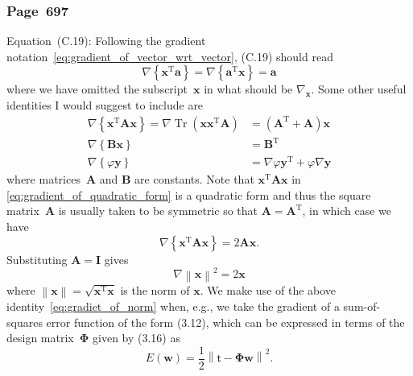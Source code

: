 \documentclass[12pt,a4paper]{article}
\newcommand{\erratum}[1]{%
\subsubsection*{#1}
\addcontentsline{toc}{subsection}{#1}}
\begin{document}
\erratum{Page~697}
Equation~(C.19):
Following the gradient notation~\eqref{eq:gradient_of_vector_wrt_vector}, (C.19) should read
\begin{equation}
\nabla \left\{ \mathbf{x}^{\operatorname{T}} \mathbf{a} \right\} = 
\nabla \left\{ \mathbf{a}^{\operatorname{T}} \mathbf{x} \right\} = 
\mathbf{a}
\end{equation}
where we have omitted the subscript~$\mathbf{x}$ in what should be $\nabla_{\mathbf{x}}$.
Some other useful identities I would suggest to include are
\begin{align}
\nabla \left\{ \mathbf{x}^{\operatorname{T}} \mathbf{A} \mathbf{x} \right\} =
\nabla \operatorname{Tr}\left(\mathbf{x}\mathbf{x}^{\operatorname{T}}\mathbf{A}\right) &=
\left( \mathbf{A}^{\operatorname{T}} + \mathbf{A} \right)\mathbf{x}
\label{eq:gradient_of_quadratic_form} \\
\nabla \left\{ \mathbf{B}\mathbf{x} \right\} & = \mathbf{B}^{\operatorname{T}}
\label{eq:gradient_of_matrix_vector_product} \\
\nabla \left\{ \varphi\mathbf{y} \right\} &=
\nabla\varphi \mathbf{y}^{\operatorname{T}} + \varphi \nabla\mathbf{y}
\label{eq:gradient_of_scalar_vector_product}
\end{align}
where matrices~$\mathbf{A}$ and $\mathbf{B}$ are constants.
Note that $\mathbf{x}^{\operatorname{T}} \mathbf{A} \mathbf{x}$ in
\eqref{eq:gradient_of_quadratic_form} is a quadratic form and thus
the square matrix~$\mathbf{A}$ is usually taken to be symmetric so that
$\mathbf{A} = \mathbf{A}^{\operatorname{T}}$, in which case we have
\begin{equation}
\nabla \left\{ \mathbf{x}^{\operatorname{T}} \mathbf{A} \mathbf{x} \right\} =
2\mathbf{A} \mathbf{x} \label{eq:gradient_of_quadratic_form_symmetric} .
\end{equation}
Substituting $\mathbf{A} = \mathbf{I}$ gives
\begin{equation}
\nabla \left\| \mathbf{x} \right\|^{2} = 2\mathbf{x} \label{eq:gradiet_of_norm}
\end{equation}
where $\left\| \mathbf{x} \right\| = \sqrt{\mathbf{x}^{\operatorname{T}}\mathbf{x}}$ is
the norm of $\mathbf{x}$.
We make use of the above identity~\eqref{eq:gradiet_of_norm} when, e.g., we take the gradient of
a sum-of-squares error function of the form (3.12),
which can be expressed in terms of the design matrix~$\bm{\Phi}$ given by (3.16) as
\begin{equation}
E(\mathbf{w}) = \frac{1}{2} \left\| \bm{\mathsf{t}} - \bm{\Phi}\mathbf{w} \right\|^2
\label{eq:sum_of_squares_error} .
\end{equation}
\end{document}
